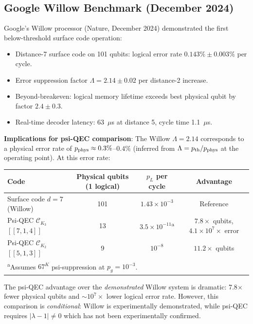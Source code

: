 \documentclass[11pt]{article}
\theoremstyle{definition}
\theoremstyle{remark}
\newcommand{\CK}{\mathcal{C}_K}
\newcommand{\ee}[1]{\times 10^{#1}}
\newcommand{\lamdiff}{|\lambda-1|}
\begin{document}
\subsection{Google Willow Benchmark (December 2024)}
\label{sec:willow}

Google's Willow processor (Nature, December 2024) demonstrated the first
below-threshold surface code operation:

\begin{itemize}[nosep]
  \item Distance-7 surface code on 101 qubits: logical error rate
    $0.143\% \pm 0.003\%$ per cycle.
  \item Error suppression factor $\Lambda = 2.14 \pm 0.02$ per
    distance-2 increase.
  \item Beyond-breakeven: logical memory lifetime exceeds best physical
    qubit by factor $2.4 \pm 0.3$.
  \item Real-time decoder latency: 63~$\mu$s at distance 5, cycle time
    1.1~$\mu$s.
\end{itemize}

\textbf{Implications for psi-QEC comparison}:
The Willow $\Lambda = 2.14$ corresponds to a physical error rate of
$p_{\rm phys} \approx 0.3\%$--$0.4\%$ (inferred from $\Lambda =
p_{\rm th}/p_{\rm phys}$ at the operating point).  At this error rate:

\begin{center}
\begin{tabular}{@{}lccc@{}}
\toprule
Code & Physical qubits (1 logical) & $p_L$ per cycle & Advantage \\
\midrule
Surface code $d=7$ (Willow) & 101 & $1.43\ee{-3}$ & Reference \\
Psi-QEC $\CK_3$ $[[7,1,4]]$ & 13 & $3.5\ee{-11}$\textsuperscript{a} &
  $7.8\times$ qubits, $4.1\ee{7}\times$ error \\
Psi-QEC $\CK_2$ $[[5,1,3]]$ & 9 & $10^{-8}$ & $11.2\times$ qubits \\
\bottomrule
\multicolumn{4}{l}{\textsuperscript{a}Assumes $67^K$ psi-suppression at $p_g = 10^{-3}$.}
\end{tabular}
\end{center}

The psi-QEC advantage over the \emph{demonstrated} Willow system is
dramatic: 7.8$\times$ fewer physical qubits and $\sim 10^7\times$ lower
logical error rate.  However, this comparison is \emph{conditional}:
Willow is experimentally demonstrated, while psi-QEC requires
$\lamdiff \neq 0$ which has not been experimentally confirmed.
\end{document}
